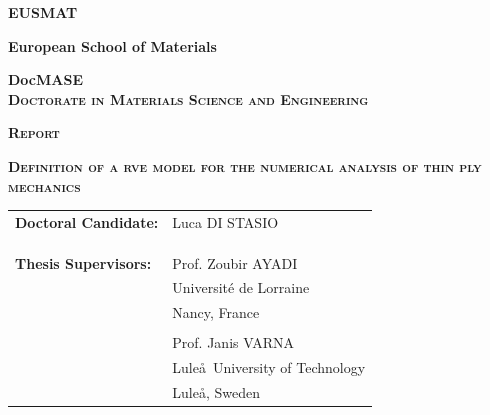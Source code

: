 \documentclass[a4paper, twoside,12pt, abstract]{scrartcl} %
\begin{document}
\begin{center}

\vspace*{0.1cm}

\begin{Large}
\textbf{\textsc{EUSMAT}}\\[0.75ex]
\end{Large}

\begin{large}
\textbf{European School of Materials}\\[0.75ex]

\vspace*{1cm}

\textbf{DocMASE}\\[0.75ex]
\textbf{\textsc{Doctorate in Materials Science and Engineering}}
\end{large}

\vspace{1cm}

\begin{Large}
\textbf{\textsc{Report}}\\[0.75ex]
\end{Large}
\vspace*{0.5cm}

\begin{LARGE}
\textbf{\textsc{Definition of a \acrfull{rve} model for the numerical analysis of thin ply mechanics}}\\[0.75ex]
\end{LARGE}
\vspace*{2.5cm}

\begin{flushright}
\begin{tabular}{l l }
{\large \textbf{Doctoral Candidate:}} & {\large Luca DI STASIO}\\
&\\
&\\
&\\
{\large \textbf{Thesis Supervisors:}}& {\large Prof. Zoubir AYADI}\\
&{\large Universit\'e de Lorraine}\\
&{\large Nancy, France}\\
&\\
& {\large Prof. Janis VARNA}\\
&{\large Lule\aa\ University of Technology}\\
&{\large Lule\aa, Sweden}\\
\end{tabular}
\end{flushright}


\end{center}
\end{document}
